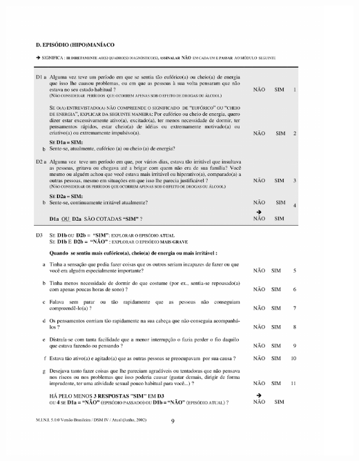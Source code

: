 \documentclass[chapter=TITLE,
               oneside,
               12pt,
               a4paper,
               english,
               brazil]{abntex2}    %
\begin{document}
\begin{anexosenv}
        \begin{center}
        \includegraphics[width=1\textwidth]{img/modulominimania01.pdf}
        \end{center}


\end{anexosenv}
\end{document}
